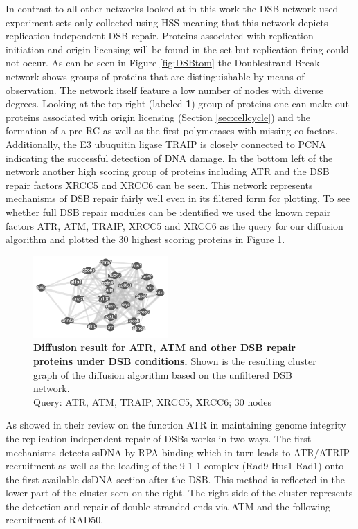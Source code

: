 In contrast to all other networks looked at in this work the DSB network used experiment sets only collected using HSS meaning that this network depicts replication independent DSB repair. Proteins associated with replication initiation and origin licensing will be found in the set but replication firing could not occur. As can be seen in Figure \ref{fig:DSBtom} the Doublestrand Break network shows groups of proteins that are distinguishable by means of observation. The network itself feature a low number of nodes with diverse degrees. Looking at the top right (labeled \textbf{1}) group of proteins one can make out proteins associated with origin licensing (Section \ref{sec:cellcycle}) and the formation of a pre-RC as well as the first polymerases with missing co-factors. Additionally, the E3 ubuquitin ligase TRAIP is closely connected to PCNA indicating the successful detection of DNA damage. In the bottom left of the network another high scoring group of proteins including ATR and the DSB repair factors XRCC5 and XRCC6 can be seen. This network represents mechanisms of DSB repair fairly well even in its filtered form for plotting. To see whether full DSB repair modules can be identified we used the known repair factors ATR, ATM, TRAIP, XRCC5 and XRCC6 as the query for our diffusion algorithm and plotted the 30 highest scoring proteins in Figure \ref{fig:atratm_diff}.
\begin{figure}
    \includegraphics[width=0.46\textwidth]{resources/images/Results/dsb_diff_atratm.PNG}
    \caption[Diffusion result for ATR, ATM and other DSB repair proteins under DSB conditions]{\textbf{Diffusion result for ATR, ATM and other DSB repair proteins under DSB conditions. }Shown is the resulting cluster graph of the diffusion algorithm based on the unfiltered DSB network.\\Query: ATR, ATM, TRAIP, XRCC5, XRCC6; 30 nodes}
    \label{fig:atratm_diff}
\end{figure}
As \cite{Cimprich.2008} showed in their review on the function ATR in maintaining genome integrity the replication independent repair of DSBs works in two ways. The first mechanisms detects ssDNA by RPA binding which in turn leads to ATR/ATRIP recruitment as well as the loading of the 9-1-1 complex (Rad9-Hus1-Rad1) onto the first available dsDNA section after the DSB. This method is reflected in the lower part of the cluster seen on the right. The right side of the cluster represents the detection and repair of double stranded ends via ATM and the following recruitment of RAD50.\\
